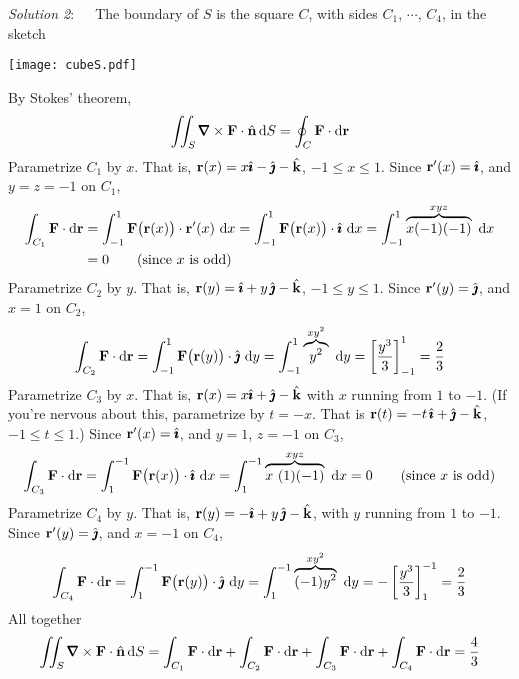 \begin{solution}
\emph{Solution 2}:\ \ \ 
The boundary of $S$ is the square $C$, with sides $C_1$, $\cdots$, $C_4$, 
in the sketch
\begin{center}
       \texttt{[image: cubeS.pdf]}
\end{center}
By Stokes' theorem,
\begin{equation*}
\dblInt_S\vnabla\times\vF\cdot\hn\, \dee{S}
=\oint_{C}\vF\cdot \dee{\vr}
\end{equation*}
Parametrize $C_1$ by $x$. That is, $\mathbf{r}(x)= x\hat{\pmb{\imath}} - \hat{\pmb{\jmath}} -\hat{\mathbf{k}}$, $-1\le x\le 1$.
Since $\mathbf{r}'(x) = \hat{\pmb{\imath}}$, and $y=z=-1$ on $C_1$,
\begin{align*}
\int_{C_1}\mathbf{F}\cdot \mathrm{d}\mathbf{r}
&=\int_{-1}^1 \mathbf{F}\big(\mathbf{r}(x)\big)\cdot\mathbf{r}'(x)\ \mathrm{d}x
=\int_{-1}^1 \mathbf{F}\big(\mathbf{r}(x)\big)\cdot\hat{\pmb{\imath}}\ \mathrm{d}x
=\int_{-1}^1\overbrace{x(-1)(-1)}^{xyz}\ \mathrm{d}x \\
&=0\qquad\text{(since $x$ is odd)}
\end{align*}
Parametrize $C_2$ by $y$. That is, $\mathbf{r}(y)= \hat{\pmb{\imath}} + y\,\hat{\pmb{\jmath}} -\hat{\mathbf{k}}$, $-1\le y\le 1$.
Since $\mathbf{r}'(y) = \hat{\pmb{\jmath}}$, and $x=1$ on $C_2$,
\begin{align*}
\int_{C_2}\mathbf{F}\cdot \mathrm{d}\mathbf{r}
=\int_{-1}^1 \mathbf{F}\big(\mathbf{r}(y)\big)\cdot\hat{\pmb{\jmath}}\ \mathrm{d}y
=\int_{-1}^1\overbrace{y^2}^{xy^2}\ \mathrm{d}y
=\left[\frac{y^3}{3}\right]_{-1}^1
=\frac{2}{3}
\end{align*}
Parametrize $C_3$ by $x$. That is, $\mathbf{r}(x)= x\hat{\pmb{\imath}} + \hat{\pmb{\jmath}} -\hat{\mathbf{k}}$ with $x$ running
from $1$ to $-1$. (If you're nervous about this, parametrize
by $t=-x$. That is $\mathbf{r}(t)= -t\,\hat{\pmb{\imath}} + \hat{\pmb{\jmath}} -\hat{\mathbf{k}}$, $-1\le t\le 1$.)
Since $\mathbf{r}'(x) = \hat{\pmb{\imath}}$, and $y=1$, $z=-1$ on $C_3$,
\begin{align*}
\int_{C_3}\mathbf{F}\cdot \mathrm{d}\mathbf{r}
=\int^{-1}_1 \mathbf{F}\big(\mathbf{r}(x)\big)\cdot\hat{\pmb{\imath}}\ \mathrm{d}x
=\int^{-1}_1\overbrace{x\ (1)(-1)}^{xyz}\ \mathrm{d}x
=0\qquad\text{(since $x$ is odd)}
\end{align*}
Parametrize $C_4$ by $y$. That is, $\mathbf{r}(y)= -\hat{\pmb{\imath}} + y\,\hat{\pmb{\jmath}} -\hat{\mathbf{k}}$, with
$y$ running from $1$ to $-1$. Since $\mathbf{r}'(y) = \hat{\pmb{\jmath}}$, and $x=-1$ on $C_4$,
\begin{align*}
\int_{C_4}\mathbf{F}\cdot \mathrm{d}\mathbf{r}
=\int^{-1}_1 \mathbf{F}\big(\mathbf{r}(y)\big)\cdot\hat{\pmb{\jmath}}\ \mathrm{d}y
=\int^{-1}_1\overbrace{(-1)y^2}^{xy^2}\ \mathrm{d}y
=-\left[\frac{y^3}{3}\right]^{-1}_1
=\frac{2}{3}
\end{align*}
All together
\begin{equation*}
\dblInt_S\vnabla\times\vF\cdot\hn\, \dee{S}
=\int_{C_1}\vF\cdot \dee{\vr} + \int_{C_2}\vF\cdot \dee{\vr}
 +\int_{C_3}\vF\cdot \dee{\vr} + \int_{C_4}\vF\cdot \dee{\vr}
=\frac{4}{3}
\end{equation*}
\end{solution}


